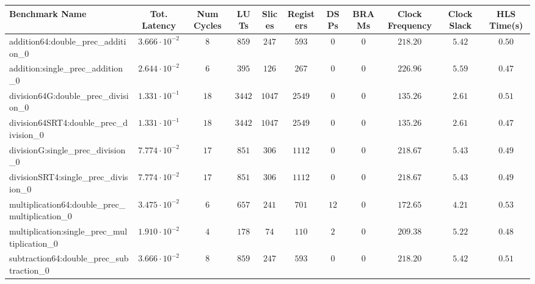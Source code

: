 \begin{tabular}{|l|c|c|c|c|c|c|c|c|c|c|}
\hline
Benchmark Name                                   & Tot. Latency            & Num Cycles & LUTs      & Slices   & Registers & DSPs   & BRAMs & Clock Frequency & Clock Slack & HLS Time(s) \\
\hline
addition64:double\_prec\_addition\_0             & $ 3.666 \cdot 10^{-2} $ & $ 8      $ & $ 859   $ & $ 247  $ & $ 593   $ & $ 0  $ & $ 0 $ & $ 218.20      $ & $ 5.42    $ & $ 0.50    $ \\
addition:single\_prec\_addition\_0               & $ 2.644 \cdot 10^{-2} $ & $ 6      $ & $ 395   $ & $ 126  $ & $ 267   $ & $ 0  $ & $ 0 $ & $ 226.96      $ & $ 5.59    $ & $ 0.47    $ \\
division64G:double\_prec\_division\_0            & $ 1.331 \cdot 10^{-1} $ & $ 18     $ & $ 3442  $ & $ 1047 $ & $ 2549  $ & $ 0  $ & $ 0 $ & $ 135.26      $ & $ 2.61    $ & $ 0.51    $ \\
division64SRT4:double\_prec\_division\_0         & $ 1.331 \cdot 10^{-1} $ & $ 18     $ & $ 3442  $ & $ 1047 $ & $ 2549  $ & $ 0  $ & $ 0 $ & $ 135.26      $ & $ 2.61    $ & $ 0.47    $ \\
divisionG:single\_prec\_division\_0              & $ 7.774 \cdot 10^{-2} $ & $ 17     $ & $ 851   $ & $ 306  $ & $ 1112  $ & $ 0  $ & $ 0 $ & $ 218.67      $ & $ 5.43    $ & $ 0.49    $ \\
divisionSRT4:single\_prec\_division\_0           & $ 7.774 \cdot 10^{-2} $ & $ 17     $ & $ 851   $ & $ 306  $ & $ 1112  $ & $ 0  $ & $ 0 $ & $ 218.67      $ & $ 5.43    $ & $ 0.49    $ \\
multiplication64:double\_prec\_multiplication\_0 & $ 3.475 \cdot 10^{-2} $ & $ 6      $ & $ 657   $ & $ 241  $ & $ 701   $ & $ 12 $ & $ 0 $ & $ 172.65      $ & $ 4.21    $ & $ 0.53    $ \\
multiplication:single\_prec\_multiplication\_0   & $ 1.910 \cdot 10^{-2} $ & $ 4      $ & $ 178   $ & $ 74   $ & $ 110   $ & $ 2  $ & $ 0 $ & $ 209.38      $ & $ 5.22    $ & $ 0.48    $ \\
subtraction64:double\_prec\_subtraction\_0       & $ 3.666 \cdot 10^{-2} $ & $ 8      $ & $ 859   $ & $ 247  $ & $ 593   $ & $ 0  $ & $ 0 $ & $ 218.20      $ & $ 5.42    $ & $ 0.51    $ \\

\end{tabular}
